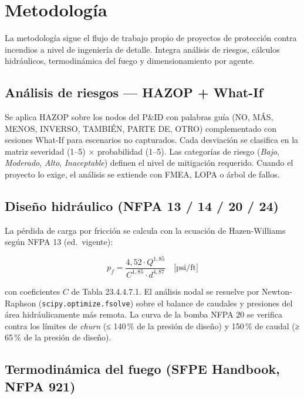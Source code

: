 \section{Metodología}

La metodología sigue el flujo de trabajo propio de proyectos de protección contra incendios a nivel de ingeniería de detalle. Integra análisis de riesgos, cálculos hidráulicos, termodinámica del fuego y dimensionamiento por agente.

\subsection{Análisis de riesgos — HAZOP + What-If}

Se aplica HAZOP sobre los nodos del P\&ID con palabras guía (NO, MÁS, MENOS, INVERSO, TAMBIÉN, PARTE DE, OTRO) complementado con sesiones What-If para escenarios no capturados. Cada desviación se clasifica en la matriz severidad (1–5) × probabilidad (1–5). Las categorías de riesgo (\textit{Bajo}, \textit{Moderado}, \textit{Alto}, \textit{Inaceptable}) definen el nivel de mitigación requerido. Cuando el proyecto lo exige, el análisis se extiende con FMEA, LOPA o árbol de fallos.

\subsection{Diseño hidráulico (NFPA 13 / 14 / 20 / 24)}

La pérdida de carga por fricción se calcula con la ecuación de Hazen-Williams según NFPA 13 (ed.\ vigente):

\begin{equation}
p_f = \frac{4{,}52 \cdot Q^{1{,}85}}{C^{1{,}85} \cdot d^{4{,}87}} \quad \text{[psi/ft]}
\label{eq:hw}
\end{equation}

con coeficientes $C$ de Tabla 23.4.4.7.1. El análisis nodal se resuelve por Newton-Raphson (\texttt{scipy.optimize.fsolve}) sobre el balance de caudales y presiones del área hidráulicamente más remota. La curva de la bomba NFPA 20 se verifica contra los límites de \textit{churn} (≤ 140\,\% de la presión de diseño) y 150\,\% de caudal (≥ 65\,\% de la presión de diseño).

\subsection{Termodinámica del fuego (SFPE Handbook, NFPA 921)}

